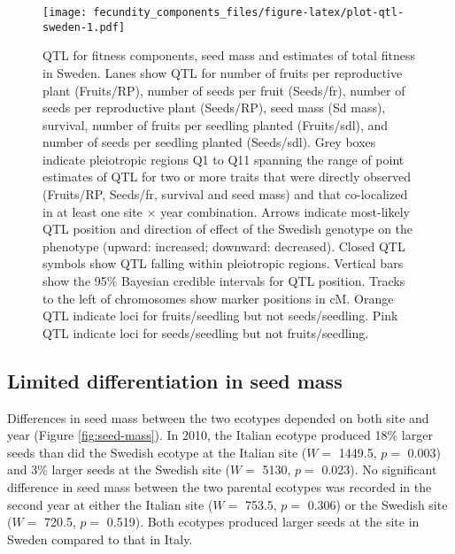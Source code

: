 \documentclass[]{article}
\begin{document}
\begin{figure}
\centering
\texttt{[image: fecundity\_components\_files/figure-latex/plot-qtl-sweden-1.pdf]}
\caption{\label{fig:plot-qtl-sweden}QTL for fitness components, seed mass and estimates of total fitness in Sweden. Lanes show QTL for number of fruits per reproductive plant (Fruits/RP), number of seeds per fruit (Seeds/fr), number of seeds per reproductive plant (Seeds/RP), seed mass (Sd mass), survival, number of fruits per seedling planted (Fruits/sdl), and number of seeds per seedling planted (Seeds/sdl). Grey boxes indicate pleiotropic regions Q1 to Q11 spanning the range of point estimates of QTL for two or more traits that were directly observed (Fruits/RP, Seeds/fr, survival and seed mass) and that co-localized in at least one site × year combination. Arrows indicate most-likely QTL position and direction of effect of the Swedish genotype on the phenotype (upward: increased; downward: decreased). Closed QTL symbols show QTL falling within pleiotropic regions. Vertical bars show the 95\% Bayesian credible intervals for QTL position. Tracks to the left of chromosomes show marker positions in cM. Orange QTL indicate loci for fruits/seedling but not seeds/seedling. Pink QTL indicate loci for seeds/seedling but not fruits/seedling.}
\end{figure}

\hypertarget{limited-differentiation-in-seed-mass}{%
\subsection{Limited differentiation in seed mass}\label{limited-differentiation-in-seed-mass}}

Differences in seed mass between the two ecotypes depended on both site and year (Figure \ref{fig:seed-mass}). In 2010, the Italian ecotype produced 18\% larger seeds than did the Swedish ecotype at the Italian site
(\(W=\) 1449.5,
\(p=\) 0.003)
and 3\% larger seeds at the Swedish site
(\(W =\) 5130,
\(p=\) 0.023).
No significant difference in seed mass between the two parental ecotypes was recorded in the second year at either the Italian site
(\(W =\) 753.5,
\(p=\) 0.306)
or the Swedish site
(\(W=\) 720.5,
\(p=\) 0.519).
Both ecotypes produced larger seeds at the site in Sweden compared to that in Italy.
\end{document}
